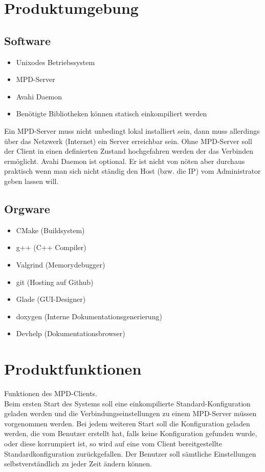 \section{Produktumgebung}
\subsection{Software}
\begin{itemize}
	\item Unixodes Betriebssystem
	\item MPD-Server 
	\item Avahi Daemon
	\item Benötigte Bibliotheken können statisch einkompiliert werden
\end{itemize}
Ein MPD-Server muss nicht unbedingt lokal installiert sein, dann muss 
allerdings über das Netzwerk (Internet) ein Server erreichbar sein.
Ohne MPD-Server soll der Client in einen definierten Zustand hochgefahren werden der das Verbinden ermöglicht.
Avahi Daemon ist optional. Er ist nicht von nöten aber durchaus praktisch wenn man sich nicht ständig den Host (bzw. die IP) 
vom Administrator geben lassen will.

\subsection{Orgware}
\begin{itemize}
	\item CMake (Buildsystem)
	\item g++ (C++ Compiler)
	\item Valgrind (Memorydebugger)
	\item git (Hosting auf Github) 
	\item Glade (GUI-Designer)
	\item doxygen  (Interne Dokumentationsgenerierung)
	\item Devhelp (Dokumentationsbrowser)
\end{itemize}

\section{Produktfunktionen}
Funktionen des MPD-Clients.\ \\
Beim ersten Start des Systems soll eine einkompilierte Standard-Konfiguration geladen werden und die Verbindungseinstellungen
zu einem MPD-Server müssen vorgenommen werden. Bei jedem weiteren Start soll die Konfiguration geladen werden,
die vom Benutzer erstellt hat,  falls keine Konfiguration gefunden wurde, oder diese korrumpiert ist,
so wird auf eine vom Client bereitgestellte Standardkonfiguration zurückgefallen. Der Benutzer soll sämtliche
Einstellungen selbstverständlich zu jeder Zeit ändern können.


